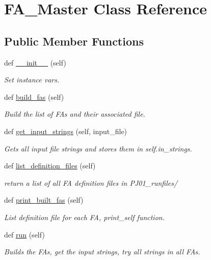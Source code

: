 \hypertarget{classfa__master_1_1_f_a___master}{}\section{F\+A\+\_\+\+Master Class Reference}
\label{classfa__master_1_1_f_a___master}
\subsection*{Public Member Functions}
\begin{DoxyCompactItemize}
\item 
def \mbox{\hyperlink{classfa__master_1_1_f_a___master_ae64f0875afe3067b97ba370b354b9213}{\+\_\+\+\_\+init\+\_\+\+\_\+}} (self)
\begin{DoxyCompactList}\small\item\em Set instance vars. \end{DoxyCompactList}\item 
def \mbox{\hyperlink{classfa__master_1_1_f_a___master_a320c46eeb8a995f713fbfb8b5f77fee2}{build\+\_\+fas}} (self)
\begin{DoxyCompactList}\small\item\em Build the list of F\+As and their associated file. \end{DoxyCompactList}\item 
def \mbox{\hyperlink{classfa__master_1_1_f_a___master_ab177481297cd31f006d95b810182ca75}{get\+\_\+input\+\_\+strings}} (self, input\+\_\+file)
\begin{DoxyCompactList}\small\item\em Gets all input file strings and stores them in self.\+in\+\_\+strings. \end{DoxyCompactList}\item 
def \mbox{\hyperlink{classfa__master_1_1_f_a___master_a9cc550ce02187d523f5d44fbfe8a06d8}{list\+\_\+definition\+\_\+files}} (self)
\begin{DoxyCompactList}\small\item\em return a list of all FA definition files in P\+J01\+\_\+runfiles/ \end{DoxyCompactList}\item 
def \mbox{\hyperlink{classfa__master_1_1_f_a___master_a29fc324de415d47fbf8e627bb07e158e}{print\+\_\+built\+\_\+fas}} (self)
\begin{DoxyCompactList}\small\item\em List definition file for each FA, print\+\_\+self function. \end{DoxyCompactList}\item 
def \mbox{\hyperlink{classfa__master_1_1_f_a___master_ad22709b2e67308af35f55680d5a026e0}{run}} (self)
\begin{DoxyCompactList}\small\item\em Builds the F\+As, get the input strings, try all strings in all F\+As. \end{DoxyCompactList}\end{DoxyCompactItemize}

